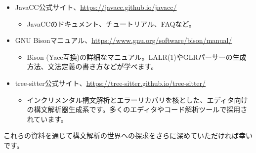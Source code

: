 \begin{itemize}
  \begin{itemize}
  \item
    ANTLRのドキュメント、チュートリアル、文法リポジトリなど。最新情報やコミュニティのサポートも得られます。
  \end{itemize}
\item
  JavaCC公式サイト、\url{https://javacc.github.io/javacc/}

  \begin{itemize}
  \item
    JavaCCのドキュメント、チュートリアル、FAQなど。
  \end{itemize}
\item
  GNU Bisonマニュアル、\url{https://www.gnu.org/software/bison/manual/}

  \begin{itemize}
  \item
    Bison (Yacc互換)の詳細なマニュアル。LALR(1)やGLRパーサーの生成方法、文法定義の書き方などが学べます。
  \end{itemize}
\item
  tree-sitter公式サイト、\url{https://tree-sitter.github.io/tree-sitter/}

  \begin{itemize}
  \item
    インクリメンタル構文解析とエラーリカバリを核とした、エディタ向けの構文解析器生成系です。多くのエディタやコード解析ツールで採用されています。
  \end{itemize}
\end{itemize}

これらの資料を通じて構文解析の世界への探求をさらに深めていただければ幸いです。
